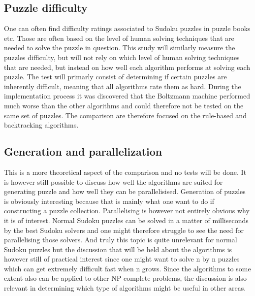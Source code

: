 \documentclass[a4paper,11pt]{kth-mag}
\begin{document}
\FloatBarrier
\subsection{Puzzle difficulty}
One can often find difficulty ratings associated to Sudoku puzzles in puzzle books etc. 
Those are often based on the level of human solving techniques that are needed to solve the puzzle in question. \cite{difficulty} 
This study will similarly measure the puzzles difficulty, but will not rely on which level of human solving techniques that are needed, but instead on how well each algorithm performs at solving each puzzle. 
The test will primarly consist of determining if certain puzzles are inherently difficult, meaning that all algorithms rate them as hard.
During the implementation process it was discovered that the Boltzmann machine performed much worse than the other algorithms and could therefore not be tested on the same set of puzzles.
The comparison are therefore focused on the rule-based and backtracking algorithms.

\FloatBarrier
\subsection{Generation and parallelization}
This is a more theoretical aspect of the comparison and no tests will be done.
It is however still possible to discuss how well the algorithms are suited for generating puzzle and how well they can be parallelisised. 
Generation of puzzles is obviously interesting because that is mainly what one want to do if constructing a puzzle collection. 
Parallelising is however not entirely obvious why it is of interest. 
Normal Sudoku puzzles can be solved in a matter of milliseconds by the best Sudoku solvers and one might therefore struggle to see the need for parallelising those solvers. 
And truly this topic is quite unrelevant for normal Sudoku puzzles but the discussion that will be held about the algorithms is however still of practical interest since one might want to solve n by n puzzles which can get extremely difficult fast when n grows. 
Since the algorithms to some extent also can be applied to other NP-complete problems, the discussion is also relevant in determining which type of algorithms might be useful in other areas. 

\FloatBarrier
\end{document}
